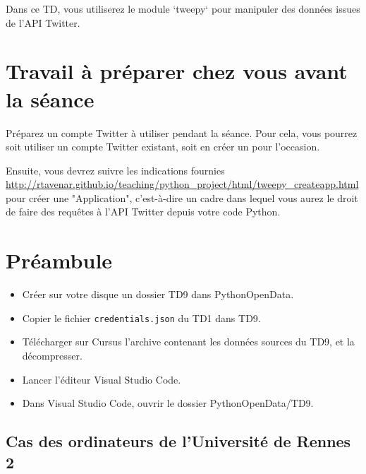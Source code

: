\documentclass[11pt,a4paper]{article}
\begin{document}
Dans ce TD, vous utiliserez le module `tweepy` pour manipuler des données issues de l'API Twitter.






\section*{Travail à préparer chez vous avant la séance}

Préparez un compte Twitter à utiliser pendant la séance. Pour cela, vous pourrez soit utiliser un compte Twitter existant, soit en créer un pour l'occasion. 

Ensuite, vous devrez suivre les indications fournies \url{http://rtavenar.github.io/teaching/python_project/html/tweepy_createapp.html} pour créer une "Application", c'est-à-dire un cadre dans lequel vous aurez le droit de faire des requêtes à l'API Twitter depuis votre code Python.


\section*{Préambule}
\begin{itemize}
    \item Créer sur votre disque un dossier TD9 dans PythonOpenData. 
    \item Copier le fichier \verb+credentials.json+ du TD1 dans TD9.
    \item Télécharger sur Cursus l'archive contenant les données sources du TD9, et la décompresser.
    \item Lancer l'éditeur Visual Studio Code.
    \item Dans Visual Studio Code, ouvrir le dossier PythonOpenData/TD9. 
\end{itemize}

\subsection*{Cas des ordinateurs de l'Université de Rennes 2}
\end{document}
